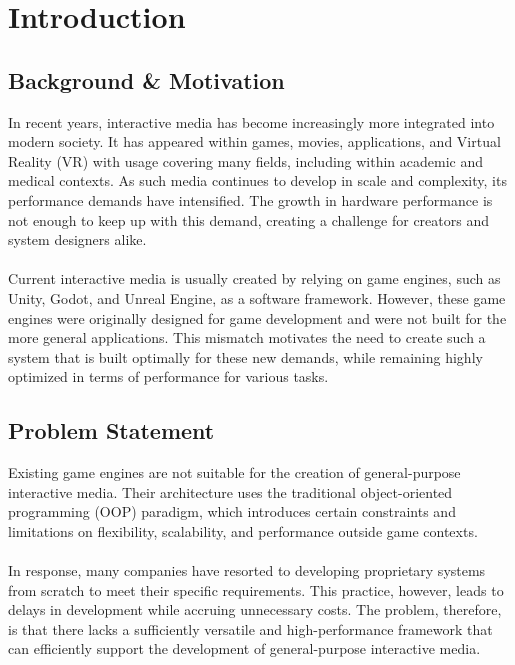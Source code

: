\section{Introduction}
\label{sec:introduction}

\subsection{Background \& Motivation}
\label{subsec:background-and-motivation}

In recent years, interactive media has become increasingly more integrated into modern society.
It has appeared within games, movies, applications, and Virtual Reality (VR) with usage covering
many fields, including within academic and medical contexts.
As such media continues to develop in scale and complexity, its performance demands have intensified.
The growth in hardware performance is not enough to keep up with this demand, creating a challenge for
creators and system designers alike.
\\\\
Current interactive media is usually created by relying on game engines, such as Unity, Godot, and Unreal Engine,
as a software framework.
However, these game engines were originally designed for game development and were not built for the more
general applications.
This mismatch motivates the need to create such a system that is built optimally for these new demands,
while remaining highly optimized in terms of performance for various tasks.

\subsection{Problem Statement}
\label{subsec:problem-statement}

Existing game engines are not suitable for the creation of general-purpose interactive media.
Their architecture uses the traditional object-oriented programming (OOP) paradigm, which introduces
certain constraints and limitations on flexibility, scalability, and performance outside game contexts.
\\\\
In response, many companies have resorted to developing proprietary systems from scratch to meet their specific requirements.
This practice, however, leads to delays in development while accruing unnecessary costs.
The problem, therefore, is that there lacks a sufficiently versatile and high-performance framework that can
efficiently support the development of general-purpose interactive media.

